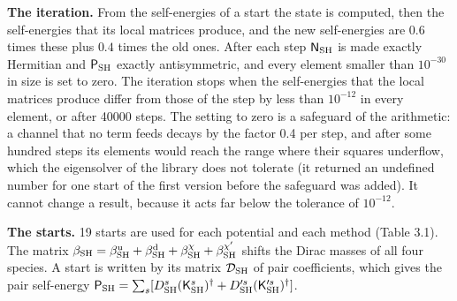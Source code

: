 \documentclass[
  10pt,
]{article}
\begin{document}
\textbf{The iteration.} From the self-energies of a start the state is
computed, then the self-energies that its local matrices produce, and
the new self-energies are \(0.6\) times these plus \(0.4\) times the old
ones. After each step \(\mathsf N_{\rm SH}\) is made exactly Hermitian
and \(\mathsf P_{\rm SH}\) exactly antisymmetric, and every element
smaller than \(10^{-30}\) in size is set to zero. The iteration stops
when the self-energies that the local matrices produce differ from those
of the step by less than \(10^{-12}\) in every element, or after 40000
steps. The setting to zero is a safeguard of the arithmetic: a channel
that no term feeds decays by the factor 0.4 per step, and after some
hundred steps its elements would reach the range where their squares
underflow, which the eigensolver of the library does not tolerate (it
returned an undefined number for one start of the first version before
the safeguard was added). It cannot change a result, because it acts far
below the tolerance of \(10^{-12}\).

\textbf{The starts.} 19 starts are used for each potential and each
method (Table 3.1). The matrix
\(\beta_{\rm SH}=\beta^{\rm u}_{\rm SH}+\beta^{\rm d}_{\rm SH}+\beta^\chi_{\rm SH}+\beta^{\chi'}_{\rm SH}\)
shifts the Dirac masses of all four species. A start is written by its
matrix \(\mathcal D_{\rm SH}\) of pair coefficients, which gives the
pair self-energy
\(\mathsf P_{\rm SH}=\sum_s[D^s_{\rm SH}(\mathsf K^s_{\rm SH})^\dagger+D'^s_{\rm SH}(\mathsf K'^s_{\rm SH})^\dagger]\).
\end{document}
